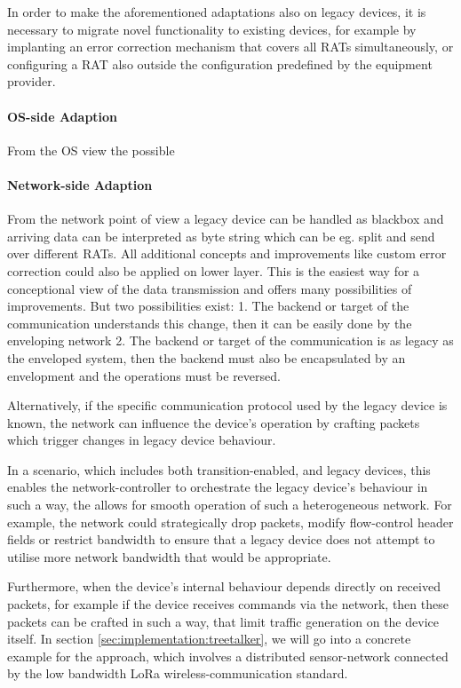 In order to make the aforementioned adaptations also on legacy devices, it is necessary to migrate novel functionality to existing devices, for example by implanting an error correction mechanism that covers all RATs simultaneously, or configuring a RAT also outside the configuration predefined by the equipment provider. 

\paragraph{OS-side Adaption}

From the OS view the possible 

\paragraph{Network-side Adaption}

From the network point of view a legacy device can be handled as blackbox and arriving data can be interpreted as byte string which can be eg. split and send over different RATs. 
All additional concepts and improvements like custom error correction could also be applied on lower layer. 
This is the easiest way for a conceptional view of the data transmission and offers many possibilities of improvements.
But two possibilities exist:
1. The backend or target of the communication understands this change, then it can be easily done by the enveloping network
2. The backend or target of the communication is as legacy as the enveloped system, then the backend must also be encapsulated by an envelopment and the operations must be reversed.  

Alternatively, if the specific communication protocol used by the legacy device is known, the network can influence the device's operation by crafting packets which trigger changes in legacy device behaviour.

In a scenario, which includes both transition-enabled, and legacy devices, this enables the network-controller to orchestrate the legacy device's behaviour in such a way, the allows for smooth operation of such a heterogeneous network.
For example, the network could strategically drop packets, modify flow-control header fields or restrict bandwidth to ensure that a legacy device does not attempt to utilise more network bandwidth that would be appropriate.

Furthermore, when the device's internal behaviour depends directly on received packets, for example if the device receives commands via the network, then these packets can be crafted in such a way, that limit traffic generation on the device itself.
In section \ref{sec:implementation:treetalker}, we will go into a concrete example for the approach, which involves a distributed sensor-network connected by the low bandwidth LoRa wireless-communication standard.

